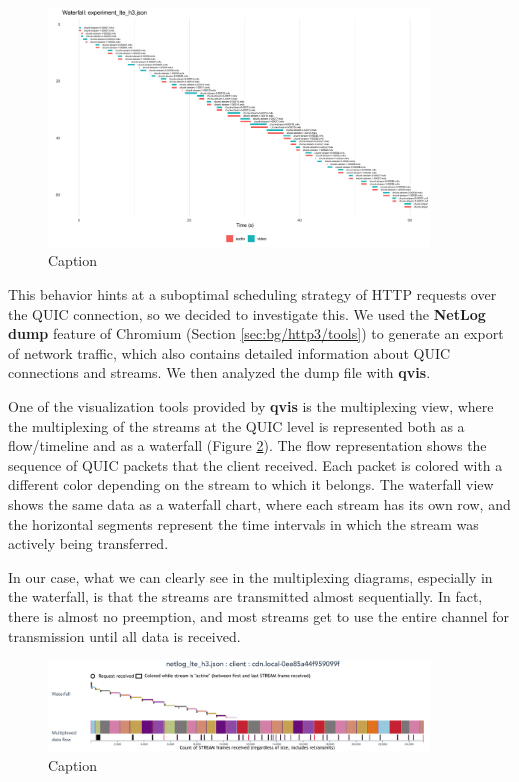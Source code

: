 \begin{figure}[h]
    \centering
    \includegraphics[width=0.9\textwidth]{res/eval_nonabr_lte_h3_waterfall.png}
    \caption{Caption}
    \label{fig:eval_nonabr_lte_h3_waterfall}
\end{figure}

This behavior hints at a suboptimal scheduling strategy of HTTP requests over the QUIC connection, so we decided to investigate this. We used the \textbf{NetLog dump} feature of Chromium (Section \ref{sec:bg/http3/tools}) to generate an export of network traffic, which also contains detailed information about QUIC connections and streams. We then analyzed the dump file with \textbf{qvis}.

One of the visualization tools provided by \textbf{qvis} is the multiplexing view, where the multiplexing of the streams at the QUIC level is represented both as a flow/timeline and as a waterfall (Figure \ref{fig:eval_noabr_qvis1}). The flow representation shows the sequence of QUIC packets that the client received. Each packet is colored with a different color depending on the stream to which it belongs. The waterfall view shows the same data as a waterfall chart, where each stream has its own row, and the horizontal segments represent the time intervals in which the stream was actively being transferred.

In our case, what we can clearly see in the multiplexing diagrams, especially in the waterfall, is that the streams are transmitted almost sequentially. In fact, there is almost no preemption, and most streams get to use the entire channel for transmission until all data is received.

\begin{figure}[h]
    \centering
    \includegraphics[width=0.9\textwidth]{res/eval_noabr_qvis1.png}
    \caption{Caption}
    \label{fig:eval_noabr_qvis1}
\end{figure}

